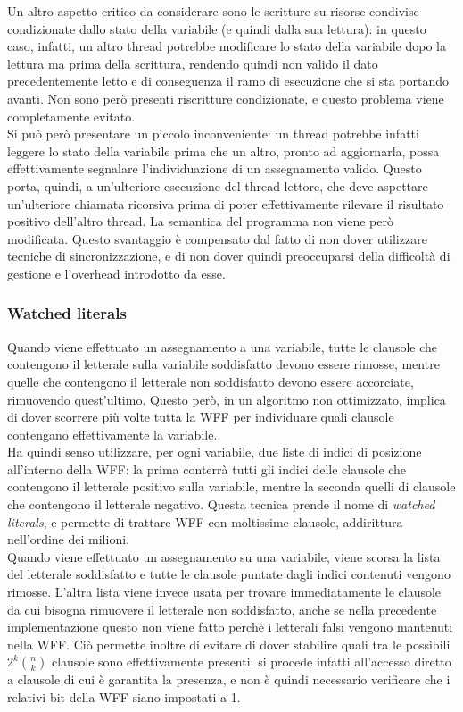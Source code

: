 Un altro aspetto critico da considerare sono le scritture su risorse condivise condizionate dallo stato della variabile (e quindi dalla sua lettura): in questo caso, infatti, un altro thread potrebbe modificare lo stato della variabile dopo la lettura ma prima della scrittura, rendendo quindi non valido il dato precedentemente letto e di conseguenza il ramo di esecuzione che si sta portando avanti.
Non sono però presenti riscritture condizionate, e questo problema viene completamente evitato.\\
Si può però presentare un piccolo inconveniente: un thread potrebbe infatti leggere lo stato della variabile prima che un altro, pronto ad aggiornarla, possa effettivamente segnalare l'individuazione di un assegnamento valido. Questo porta, quindi, a un'ulteriore esecuzione del thread lettore, che deve aspettare un'ulteriore chiamata ricorsiva prima di poter effettivamente rilevare il risultato positivo dell'altro thread. La semantica del programma non viene però modificata. Questo svantaggio è compensato dal fatto di non dover utilizzare tecniche di sincronizzazione, e di non dover quindi preoccuparsi della difficoltà di gestione e l'overhead introdotto da esse.

\subsubsection{Watched literals}
Quando viene effettuato un assegnamento a una variabile, tutte le clausole che contengono
il letterale sulla variabile soddisfatto devono essere rimosse, mentre quelle che contengono il letterale non soddisfatto devono essere accorciate, rimuovendo quest'ultimo.
Questo però, in un algoritmo non ottimizzato, implica di dover scorrere più volte tutta la WFF per individuare quali clausole contengano effettivamente la variabile.\\
Ha quindi senso utilizzare, per ogni variabile, due liste di indici di posizione all'interno della WFF: la prima conterrà tutti gli indici delle clausole che contengono il letterale positivo sulla variabile, mentre la seconda quelli di clausole che contengono il letterale negativo.
Questa tecnica prende il nome di \textit{watched literals}, e permette di trattare WFF con moltissime clausole, addirittura nell'ordine dei milioni.\\
Quando viene effettuato un assegnamento su una variabile, viene scorsa la lista del letterale soddisfatto e tutte le clausole puntate dagli indici contenuti vengono rimosse.
L'altra lista viene invece usata per trovare immediatamente le clausole da cui bisogna rimuovere il letterale non soddisfatto, anche se nella precedente implementazione questo non viene fatto perchè i letterali falsi vengono mantenuti nella WFF.
Ciò permette inoltre di evitare di dover stabilire quali tra le possibili $2^k \binom{n}{k}$ clausole sono effettivamente presenti: si procede infatti all'accesso diretto a clausole di cui è garantita la presenza, e non è quindi necessario verificare che i relativi bit della WFF siano impostati a 1.

